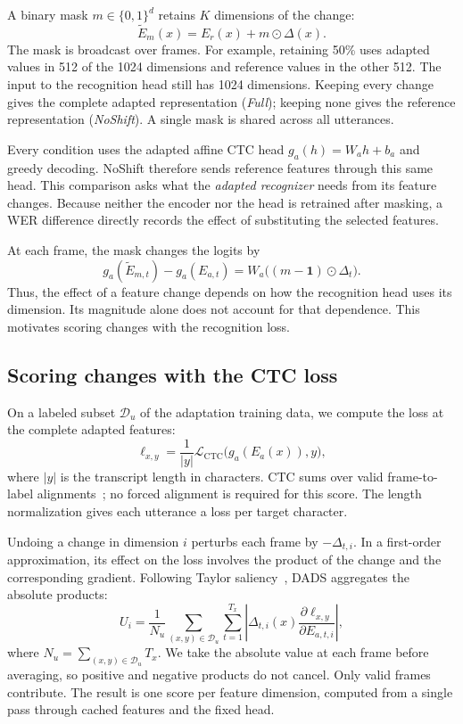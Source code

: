 \documentclass{article}
\newcommand{\CTC}{\mathrm{CTC}}
\newcommand{\Du}{\mathcal{D}_{u}}
\begin{document}
A binary mask $m\in\{0,1\}^{d}$ retains $K$ dimensions of the change:
\begin{equation}
 \widetilde E_m(x)=E_r(x)+m\odot\Delta(x).
 \label{eq:mask}
\end{equation}
The mask is broadcast over frames. For example, retaining 50\% uses adapted values in 512 of the 1024 dimensions and reference values in the other 512. The input to the recognition head still has 1024 dimensions. Keeping every change gives the complete adapted representation (\emph{Full}); keeping none gives the reference representation (\emph{NoShift}). A single mask is shared across all utterances.

Every condition uses the adapted affine CTC head $g_a(h)=W_ah+b_a$ and greedy decoding. NoShift therefore sends reference features through this same head. This comparison asks what the \emph{adapted recognizer} needs from its feature changes. Because neither the encoder nor the head is retrained after masking, a WER difference directly records the effect of substituting the selected features.

At each frame, the mask changes the logits by
\begin{equation}
 g_a(\widetilde E_{m,t})-g_a(E_{a,t})
 =W_a\bigl((m-\mathbf{1})\odot\Delta_t\bigr).
 \label{eq:logits}
\end{equation}
Thus, the effect of a feature change depends on how the recognition head uses its dimension. Its magnitude alone does not account for that dependence. This motivates scoring changes with the recognition loss.

\subsection{Scoring changes with the CTC loss}
On a labeled subset $\Du$ of the adaptation training data, we compute the loss at the complete adapted features:
\begin{equation}
 \ell_{x,y}=\frac{1}{|y|}\mathcal{L}_{\CTC}\bigl(g_a(E_a(x)),y\bigr),
 \label{eq:loss}
\end{equation}
where $|y|$ is the transcript length in characters. CTC sums over valid frame-to-label alignments~\cite{graves2006ctc}; no forced alignment is required for this score. The length normalization gives each utterance a loss per target character.

Undoing a change in dimension $i$ perturbs each frame by $-\Delta_{t,i}$. In a first-order approximation, its effect on the loss involves the product of the change and the corresponding gradient. Following Taylor saliency~\cite{molchanov2017pruning}, DADS aggregates the absolute products:
\begin{equation}
 U_i=\frac{1}{N_u}\sum_{(x,y)\in\Du}\sum_{t=1}^{T_x}
 \left|\Delta_{t,i}(x)\frac{\partial\ell_{x,y}}{\partial E_{a,t,i}}\right|,
 \label{eq:utility}
\end{equation}
where $N_u=\sum_{(x,y)\in\Du}T_x$. We take the absolute value at each frame before averaging, so positive and negative products do not cancel. Only valid frames contribute. The result is one score per feature dimension, computed from a single pass through cached features and the fixed head.
\end{document}
